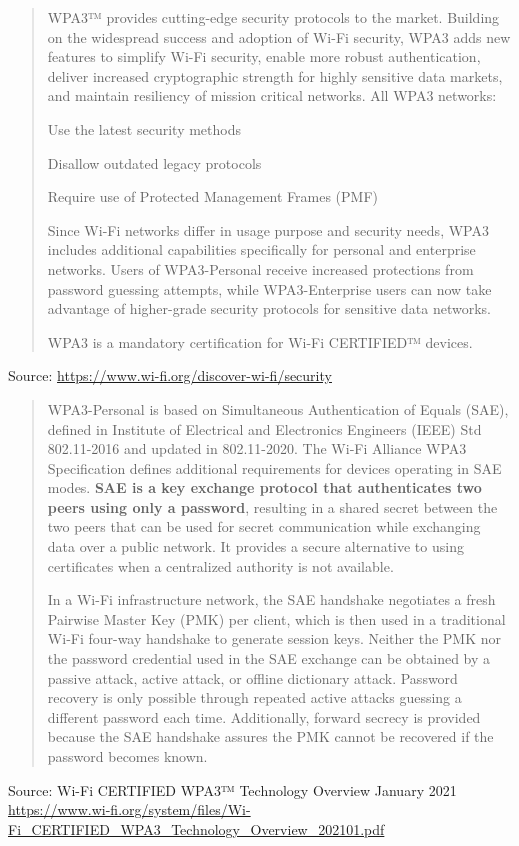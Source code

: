 \documentclass[Screen16to9,17pt]{foils}
\begin{document}
\begin{quote}

WPA3™ provides cutting-edge security protocols to the market. Building on the widespread success and adoption of Wi-Fi security, WPA3 adds new features to simplify Wi-Fi security, enable more robust authentication, deliver increased cryptographic strength for highly sensitive data markets, and maintain resiliency of mission critical networks. All WPA3 networks:

\begin{list2}
\item Use the latest security methods
\item Disallow outdated legacy protocols
\item Require use of Protected Management Frames (PMF)
\end{list2}
Since Wi-Fi networks differ in usage purpose and security needs, WPA3 includes additional capabilities specifically for personal and enterprise networks. Users of WPA3-Personal receive increased protections from password guessing attempts, while WPA3-Enterprise users can now take advantage of higher-grade security protocols for sensitive data networks.

WPA3 is a mandatory certification for Wi-Fi CERTIFIED™ devices.
\end{quote}
Source: \url{https://www.wi-fi.org/discover-wi-fi/security}



\begin{quote}
WPA3-Personal is based on Simultaneous Authentication of Equals (SAE), defined in Institute of Electrical and Electronics Engineers (IEEE) Std 802.11-2016 and updated in 802.11-2020. The Wi‑Fi Alliance WPA3 Specification defines additional requirements for devices operating in SAE modes. {\bf SAE is a key exchange protocol that authenticates two peers using only a password}, resulting in a shared secret between the two peers that can be used for secret communication while exchanging data over a public network. It provides a secure alternative to using certificates when a centralized authority is not available.

In a Wi-Fi infrastructure network, the SAE handshake negotiates a fresh Pairwise Master Key (PMK) per client, which is then used in a traditional Wi‑Fi four-way handshake to generate session keys. Neither the PMK nor the password credential used in the SAE exchange can be obtained by a passive attack, active attack, or offline dictionary attack. Password recovery is only possible through repeated active attacks guessing a different password each time.
Additionally, forward secrecy is provided because the SAE handshake assures the PMK cannot be recovered if the password becomes known.
\end{quote}
Source: Wi-Fi CERTIFIED WPA3™
Technology Overview
January 2021\\
\url{https://www.wi-fi.org/system/files/Wi-Fi_CERTIFIED_WPA3_Technology_Overview_202101.pdf}
\end{document}
